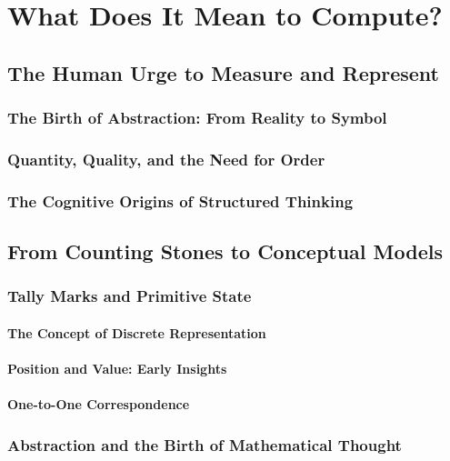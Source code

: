 \documentclass[12pt, oneside]{book}
\begin{document}

\chapter{What Does It Mean to Compute?}

\section{The Human Urge to Measure and Represent}
\subsection{The Birth of Abstraction: From Reality to Symbol}
\subsection{Quantity, Quality, and the Need for Order}
\subsection{The Cognitive Origins of Structured Thinking}

\section{From Counting Stones to Conceptual Models}
\subsection{Tally Marks and Primitive State}
\subsubsection{The Concept of Discrete Representation}
\subsubsection{Position and Value: Early Insights}
\subsubsection{One-to-One Correspondence}

\subsection{Abstraction and the Birth of Mathematical Thought}
\end{document}

